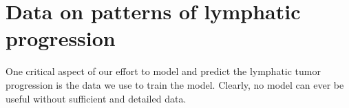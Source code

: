 \documentclass[\relativeRoot/main.tex]{subfiles}
\begin{document}
\chapter{Data on patterns of lymphatic progression}
\label{chap:dataset}

One critical aspect of our effort to model and predict the lymphatic tumor progression is the data we use to train the model. Clearly, no model can ever be useful without sufficient and detailed data.


\end{document}
